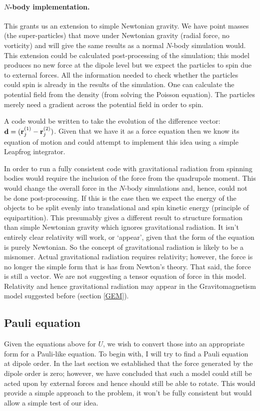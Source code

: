 \paragraph{$N$-body implementation.}
This grants us an extension to simple Newtonian gravity. We have point masses (the super-particles) that move under Newtonian gravity (radial force, no vorticity) and will give the same results as a normal $N$-body simulation would. This extension could be calculated post-processing of the simulation; this model produces no new force at the dipole level but we expect the particles to spin due to external forces. All the information needed to check whether the particles could spin is already in the results of the simulation. One can calculate the potential field from the density (from solving the Poisson equation). The particles merely need a gradient across the potential field in order to spin.

A code would be written to take the evolution of the difference vector: ${\bf d} = ({\bf r}^{(1)}_j - {\bf r}^{(2)}_j)$. Given that we have it as a force equation then we know its equation of motion and could attempt to implement this idea using a simple Leapfrog integrator.

In order to run a fully consistent code with gravitational radiation from spinning bodies would require the inclusion of the force from the quadrupole moment. This would change the overall force in the $N$-body simulations and, hence, could not be done post-processing. If this is the case then we expect the energy of the objects to be split evenly into translational and spin kinetic energy (principle of equipartition). This presumably gives a different result to structure formation than simple Newtonian gravity which ignores gravitational radiation. It isn't entirely clear relativity will work, or `appear', given that the form of the equation is purely Newtonian. So the concept of gravitational radiation is likely to be a misnomer. Actual gravitational radiation requires relativity; however, the force is no longer the simple form that is has from Newton's theory. That said, the force is still a vector. We are not suggesting a tensor equation of force in this model. Relativity and hence gravitational radiation may appear in the Gravitomagnetism model suggested before (section \ref{GEM}).


\subsection{Pauli equation}
\label{pauli_d}
Given the equations above for $U$, we wish to convert those into an appropriate form for a Pauli-like equation. To begin with, I will try to find a Pauli equation at dipole order. In the last section we established that the force generated by the dipole order is zero; however, we have concluded that such a model could still be acted upon by external forces and hence should still be able to rotate. This would provide a simple approach to the problem, it won't be fully consistent but would allow a simple test of our idea.

